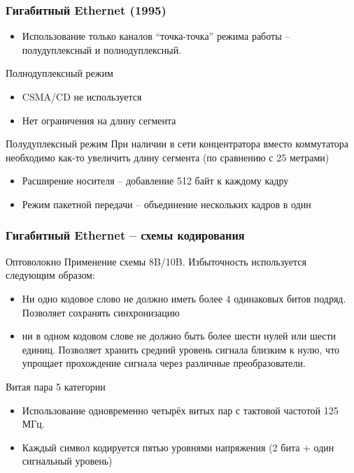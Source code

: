 \documentclass[utf8]{beamer}
\begin{document}
\begin{frame}
\frametitle{Гигабитный Ethernet (1995)}
\begin{itemize}
\item Использование только каналов ``точка-точка''
 режима работы -- полудуплексный и полнодуплексный.
\end{itemize}
\begin{block}{Полнодуплексный режим}
\begin{itemize}
\item CSMA/CD не используется
\item Нет ограничения на длину сегмента
\end{itemize}
\end{block}
\begin{block}{Полудуплексный режим }
При наличии в сети концентратора вместо коммутатора необходимо как-то увеличить длину сегмента (по сравнению с 25 метрами)
\begin{itemize}
\item Расширение носителя -- добавление 512 байт к каждому кадру
\item Режим пакетной передачи -- объединение нескольких кадров в один
\end{itemize}
\end{block}
\end{frame}
\begin{frame}
\frametitle{Гигабитный Ethernet -- схемы кодирования}
\begin{block}{Оптоволокно}
Применение схемы 8B/10B. Избыточность используется следующим образом:
\begin{itemize}
\item Ни одно кодовое слово не должно иметь более 4 одинаковых битов подряд. Позволяет сохранять синхронизацию
\item ни в одном кодовом слове не должно быть более шести нулей или шести единиц. Позволяет хранить средний уровень сигнала близким к нулю, что упрощает прохождение сигнала через различные преобразователи.
\end{itemize}
\end{block}

\begin{block}{Витая пара 5 категории}
\begin{itemize}
\item Использование одновременно четырёх витых пар с тактовой частотой 125 МГц.
\item Каждый символ кодируется пятью уровнями напряжения (2 бита + один сигнальный уровень)
\end{itemize}
\end{block}
\end{frame}
\end{document}
